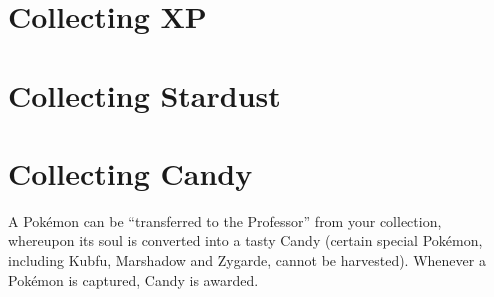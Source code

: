 \section{Collecting XP}

\section{Collecting Stardust}

\section{Collecting Candy}
A Pokémon can be ``transferred to the Professor'' from your collection,
 whereupon its soul is converted into a tasty Candy (certain special
 Pokémon, including Kubfu, Marshadow and Zygarde, cannot be harvested).
Whenever a Pokémon is captured, Candy is awarded.
